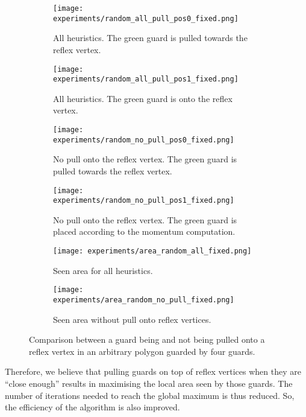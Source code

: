 \begin{figure}[h!]
    \centering
    \begin{subfigure}{0.45\textwidth}
        \texttt{[image: experiments/random\_all\_pull\_pos0\_fixed.png]}
        \caption{All heuristics. The green guard is pulled towards the reflex vertex.}
        \label{fig:all_pull_pos0}
    \end{subfigure}
    \hfill
    \begin{subfigure}{0.45\textwidth}
        \texttt{[image: experiments/random\_all\_pull\_pos1\_fixed.png]}
        \caption{All heuristics. The green guard is onto the reflex vertex.}
        \label{fig:all_pull_pos1}
    \end{subfigure}
    \vfill
    \begin{subfigure}{0.45\textwidth}
        \texttt{[image: experiments/random\_no\_pull\_pos0\_fixed.png]}
        \caption{No pull onto the reflex vertex. The green guard is pulled towards the reflex vertex.}
        \label{fig:no_pull_pos0}
    \end{subfigure}
    \hfill
    \begin{subfigure}{0.45\textwidth}
        \texttt{[image: experiments/random\_no\_pull\_pos1\_fixed.png]}
        \caption{No pull onto the reflex vertex. The green guard is placed according to the momentum computation.}
        \label{fig:no_pull_pos1}
    \end{subfigure}
    \vfill
    \begin{subfigure}{0.45\textwidth}
        \texttt{[image: experiments/area\_random\_all\_fixed.png]}
        \caption{Seen area for all heuristics.}
        \label{fig:area_all_pull}
    \end{subfigure}
    \hfill
    \begin{subfigure}{0.45\textwidth}
        \texttt{[image: experiments/area\_random\_no\_pull\_fixed.png]}
        \caption{Seen area without pull onto reflex vertices.}
        \label{fig:area_no_pull}
    \end{subfigure}
    \caption{Comparison between a guard being and not being pulled onto a reflex vertex in an arbitrary polygon guarded by four guards.}
    \label{fig:no_pull}
\end{figure}


Therefore, we believe that pulling guards on top of reflex vertices when they are ``close enough'' results in maximising the local area seen by those guards. The number of iterations needed to reach the global maximum is thus reduced. So, the efficiency of the algorithm is also improved.

